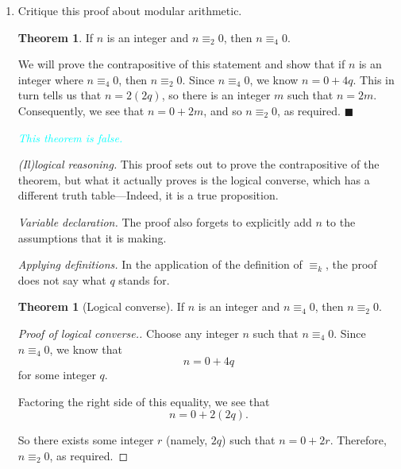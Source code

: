 \documentclass{article}
\renewcommand{\(}{\left(}
\renewcommand{\)}{\right)}
\renewcommand\qedsymbol{$\blacksquare$}
\newenvironment{prf}{{\bfseries Proof.}}{\qedsymbol}
\theoremstyle{plain}
\theoremstyle{plain}
\theoremstyle{definition}
\newtheorem{theorem}{Theorem}[section]
\newtheorem*{thm}{Theorem}
\begin{document}
\begin{enumerate}[label*=\roman*.,ref=\roman*]
    \item Critique this proof about modular arithmetic. 
    \begin{thm}
     If $n$ is an integer and $n \equiv_2 0$, then $n \equiv_4 0$.
    \end{thm}
    \begin{prf}
    We will prove the contrapositive of this statement and show that if $n$ is an integer where $n \equiv_4 0$, then $n \equiv_2 0$. Since $n \equiv_4 0$, we know $n = 0 + 4q$. This in turn tells us that $n = 2(2q)$, so there is an integer $m$ such that $n = 2m$. Consequently, we see that $n = 0 + 2m$, and so $n \equiv_2 0$, as required.
    \end{prf}

    \begin{shaded}
    \textit{\textcolor{cyan}{This theorem is false.}}
    
    \textit{(Il)logical reasoning.} This proof sets out to prove the contrapositive of the theorem, but what it actually proves is the logical converse, which has a different truth table---Indeed, it is a true proposition.
    
    \textit{Variable declaration.} The proof also forgets to explicitly add $n$ to the assumptions that it is making.
    
    \textit{Applying definitions.} In the application of the definition of $\equiv_k$, the proof does not say what $q$ stands for.
    
    \begin{theorem}[Logical converse]
	If $n$ is an integer and $n \equiv_4 0$, then $n \equiv_2 0$.
    \end{theorem}
    \begin{proof}[Proof of logical converse.]
    	Choose any integer $n$ such that $n \equiv_4 0$. Since $n \equiv_4 0$, we know that
    	\begin{equation}
    	n = 0 + 4q
    	\end{equation}
    	for some integer $q$.
    	
    	Factoring the right side of this equality, we see that
    	\begin{equation}
    	n = 0 + 2(2q).
    	\end{equation}
    	
    	So there exists some integer $r$ (namely, $2q$) such that $n = 0 + 2r$. Therefore, $n \equiv_2 0$, as required.
    \end{proof}
    \end{shaded}

\end{enumerate}
\end{document}
